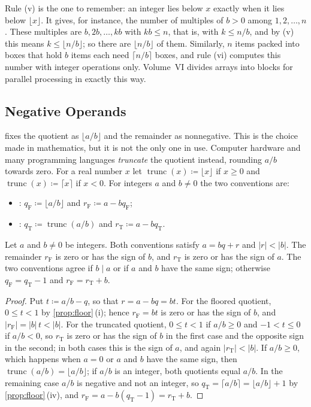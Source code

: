 Rule (v) is the one to remember: an integer lies below $x$ exactly when it lies below $\lfloor x\rfloor$. It gives, for instance, the number of multiples of $b>0$ among $1,2,\ldots,n$. These multiples are $b,2b,\ldots,kb$ with $kb\le n$, that is, with $k\le n/b$, and by (v) this means $k\le\lfloor n/b\rfloor$; so there are $\lfloor n/b\rfloor$ of them. Similarly, $n$ items packed into boxes that hold $b$ items each need $\lceil n/b\rceil$ boxes, and rule (vi) computes this number with integer operations only. Volume~VI divides arrays into blocks for parallel processing in exactly this way.

\subsection{Negative Operands}

 fixes the quotient as $\lfloor a/b\rfloor$ and the remainder as nonnegative. This is the choice made in mathematics, but it is not the only one in use. Computer hardware and many programming languages \emph{truncate} the quotient instead, rounding $a/b$ towards zero. For a real number $x$ let $\operatorname{trunc}(x)\coloneqq\lfloor x\rfloor$ if $x\ge0$ and $\operatorname{trunc}(x)\coloneqq\lceil x\rceil$ if $x<0$. For integers $a$ and $b\ne0$ the two conventions are:
\begin{itemize}
\item {}: $q_{\mathrm F}\coloneqq\lfloor a/b\rfloor$ and $r_{\mathrm F}\coloneqq a-bq_{\mathrm F}$;
\item {}: $q_{\mathrm T}\coloneqq\operatorname{trunc}(a/b)$ and $r_{\mathrm T}\coloneqq a-bq_{\mathrm T}$.
\end{itemize}

\begin{proposition}
\label{prop:trunc-floor}
Let $a$ and $b\ne0$ be integers. Both conventions satisfy $a=bq+r$ and $|r|<|b|$. The remainder $r_{\mathrm F}$ is zero or has the sign of $b$, and $r_{\mathrm T}$ is zero or has the sign of $a$. The two conventions agree if $b\mid a$ or if $a$ and $b$ have the same sign; otherwise $q_{\mathrm F}=q_{\mathrm T}-1$ and $r_{\mathrm F}=r_{\mathrm T}+b$.
\end{proposition}

\begin{proof}
Put $t\coloneqq a/b-q$, so that $r=a-bq=bt$. For the floored quotient, $0\le t<1$ by \cref{prop:floor}\,(i); hence $r_{\mathrm F}=bt$ is zero or has the sign of $b$, and $|r_{\mathrm F}|=|b|\,t<|b|$. For the truncated quotient, $0\le t<1$ if $a/b\ge0$ and $-1<t\le0$ if $a/b<0$, so $r_{\mathrm T}$ is zero or has the sign of $b$ in the first case and the opposite sign in the second; in both cases this is the sign of $a$, and again $|r_{\mathrm T}|<|b|$. If $a/b\ge0$, which happens when $a=0$ or $a$ and $b$ have the same sign, then $\operatorname{trunc}(a/b)=\lfloor a/b\rfloor$; if $a/b$ is an integer, both quotients equal $a/b$. In the remaining case $a/b$ is negative and not an integer, so $q_{\mathrm T}=\lceil a/b\rceil=\lfloor a/b\rfloor+1$ by \cref{prop:floor}\,(iv), and $r_{\mathrm F}=a-b(q_{\mathrm T}-1)=r_{\mathrm T}+b$.
\end{proof}

